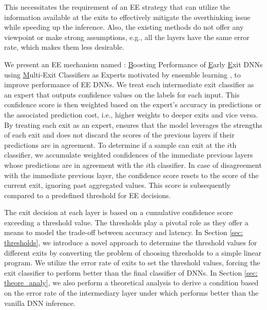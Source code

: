 This necessitates the requirement of an EE strategy that can utilize the information available at the exits to effectively mitigate the overthinking issue while speeding up the inference. Also, the existing methods do not offer any viewpoint or make strong assumptions, e.g., all the layers have the same error rate, which makes them less desirable. 

We present an EE mechanism named \algo{}: \underline{B}oosting Performance of \underline{E}arly \underline{E}xit DNNs
using \underline{M}ulti-Exit Classifiers as Experts motivated by ensemble learning \citep{dong2020survey},  to improve performance of EE DNNs. We treat each intermediate exit classifier as an expert that outputs confidence values on the labels for each input.  This confidence score is then weighted based on the expert's accuracy in predictions or the associated prediction cost, i.e., higher weights to deeper exits and vice versa. By treating each exit as an expert, \algo{} ensures that the model leverages the strengths of each exit and does not discard the scores of the previous layers if their predictions are in agreement. To determine if a sample can exit at the $i$th classifier, we accumulate weighted confidences of the immediate previous layers whose predictions are in agreement with the $i$th classifier. In case of disagreement with the immediate previous layer, the confidence score resets to the score of the current exit, ignoring past aggregated values. This score is subsequently compared to a predefined threshold for EE decisions. 



The exit decision at each layer is based on a cumulative confidence score exceeding a threshold value. The thresholds play a pivotal role as they offer a means to model the trade-off between accuracy and latency. In Section \ref{sec: thresholds}, we introduce a novel approach to determine the threshold values for different exits by converting the problem of choosing thresholds to a simple linear program. We utilize the error rate of exits to set the threshold values, forcing the exit classifier to perform better than the final classifier of DNNs. In Section \ref{sec: theore_analy}, we also perform a theoretical analysis to derive a condition based on the error rate of the intermediary layer under which \algo{} performs better than the vanilla DNN inference.

